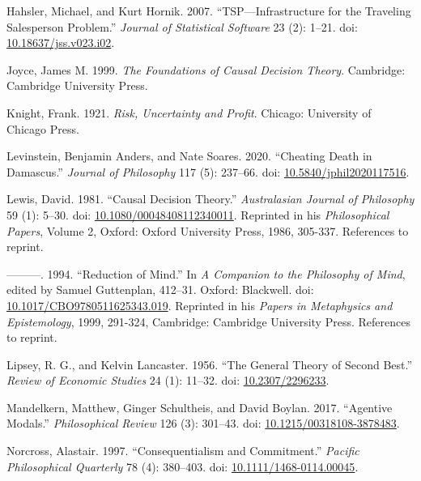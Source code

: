 \documentclass[
  11pt,
  letterpaper,
  DIV=11,
  numbers=noendperiod,
  twoside]{scrartcl}
\newlength{\cslhangindent}
\newenvironment{CSLReferences}[2] %
 {\begin{list}{}{%
  \setlength{\itemindent}{0pt}
  \setlength{\leftmargin}{0pt}
  \setlength{\parsep}{0pt}
  \ifodd #1
   \setlength{\leftmargin}{\cslhangindent}
   \setlength{\itemindent}{-1\cslhangindent}
  \fi
  \setlength{\itemsep}{#2\baselineskip}}}
 {\end{list}}
\begin{document}
\begin{CSLReferences}{1}{0}
Hahsler, Michael, and Kurt Hornik. 2007. {``TSP---Infrastructure for the
Traveling Salesperson Problem.''} \emph{Journal of Statistical Software}
23 (2): 1--21. doi:
\href{https://doi.org/10.18637/jss.v023.i02}{10.18637/jss.v023.i02}.

Joyce, James M. 1999. \emph{The Foundations of Causal Decision Theory}.
Cambridge: Cambridge University Press.

Knight, Frank. 1921. \emph{Risk, Uncertainty and Profit}. Chicago:
University of Chicago Press.

Levinstein, Benjamin Anders, and Nate Soares. 2020. {``Cheating Death in
Damascus.''} \emph{Journal of Philosophy} 117 (5): 237--66. doi:
\href{https://doi.org/10.5840/jphil2020117516}{10.5840/jphil2020117516}.

Lewis, David. 1981. {``Causal Decision Theory.''} \emph{Australasian
Journal of Philosophy} 59 (1): 5--30. doi:
\href{https://doi.org/10.1080/00048408112340011}{10.1080/00048408112340011}.
Reprinted in his \emph{Philosophical Papers}, Volume 2, Oxford: Oxford
University Press, 1986, 305-337. References to reprint.

---------. 1994. {``Reduction of Mind.''} In \emph{A Companion to the
Philosophy of Mind}, edited by Samuel Guttenplan, 412--31. Oxford:
Blackwell. doi:
\href{https://doi.org/10.1017/CBO9780511625343.019}{10.1017/CBO9780511625343.019}.
Reprinted in his \emph{Papers in Metaphysics and Epistemology}, 1999,
291-324, Cambridge: Cambridge University Press. References to reprint.

Lipsey, R. G., and Kelvin Lancaster. 1956. {``The General Theory of
Second Best.''} \emph{Review of Economic Studies} 24 (1): 11--32. doi:
\href{https://doi.org/10.2307/2296233}{10.2307/2296233}.

Mandelkern, Matthew, Ginger Schultheis, and David Boylan. 2017.
{``Agentive Modals.''} \emph{Philosophical Review} 126 (3): 301--43.
doi:
\href{https://doi.org/10.1215/00318108-3878483}{10.1215/00318108-3878483}.

Norcross, Alastair. 1997. {``Consequentialism and Commitment.''}
\emph{Pacific Philosophical Quarterly} 78 (4): 380--403. doi:
\href{https://doi.org/10.1111/1468-0114.00045}{10.1111/1468-0114.00045}.


\end{CSLReferences}
\end{document}
